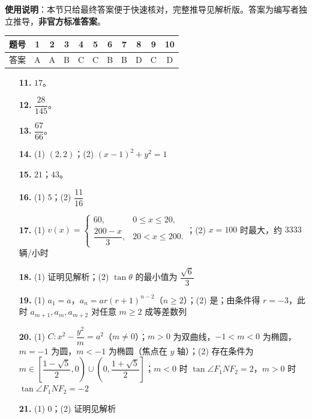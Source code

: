 
\begin{gknotice}
\textbf{使用说明}：本节只给最终答案便于快速核对，完整推导见解析版。答案为编写者独立推导，\textbf{非官方标准答案}。
\end{gknotice}

\begin{center}\begin{tabular}{ccccccccccc}
\toprule
题号 & 1 & 2 & 3 & 4 & 5 & 6 & 7 & 8 & 9 & 10 \\
\midrule
答案 & A & A & B & C & C & B & B & D & C & D \\
\bottomrule
\end{tabular}\end{center}

\begin{itemize}[leftmargin=2.6em]
  \item[\textbf{11.}] $17$。
  \item[\textbf{12.}] $\dfrac{28}{145}$。
  \item[\textbf{13.}] $\dfrac{67}{66}$。
  \item[\textbf{14.}] (1) $(2,2)$；(2) $(x-1)^2+y^2=1$
  \item[\textbf{15.}] $21$；$43$。
\end{itemize}

\begin{itemize}[leftmargin=2.6em]
  \item[\textbf{16.}] (1) $5$；(2) $\dfrac{11}{16}$
  \item[\textbf{17.}] (1) $v(x)=\begin{cases}60,&0\leqslant x\leqslant20,\\[4pt]\dfrac{200-x}3,&20<x\leqslant200.\end{cases}$；(2) $x=100$ 时最大，约 $3333$ 辆/小时
  \item[\textbf{18.}] (1) 证明见解析；(2) $\tan\theta$ 的最小值为 $\dfrac{\sqrt6}3$
  \item[\textbf{19.}] (1) $a_1=a$，$a_n=ar(r+1)^{n-2}$（$n\geqslant2$）；(2) 是；由条件得 $r=-3$，此时 $a_{m+1},a_m,a_{m+2}$ 对任意 $m\geqslant2$ 成等差数列
  \item[\textbf{20.}] (1) $C:x^2-\dfrac{y^2}{m}=a^2$（$m\neq0$）；$m>0$ 为双曲线，$-1<m<0$ 为椭圆，$m=-1$ 为圆，$m<-1$ 为椭圆（焦点在 $y$ 轴）；(2) 存在条件为 $m\in\left[\dfrac{1-\sqrt5}2,0\right)\cup\left(0,\dfrac{1+\sqrt5}2\right]$；$m<0$ 时 $\tan\angle F_1NF_2=2$，$m>0$ 时 $\tan\angle F_1NF_2=-2$
  \item[\textbf{21.}] (1) $0$；(2) 证明见解析
\end{itemize}
